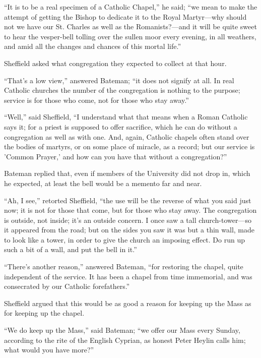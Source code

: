 ``It is to be a real specimen of a Catholic Chapel,'' he
said; ``we mean to make the attempt of getting the Bishop to
dedicate it to the Royal Martyr—why should not we have our St.
Charles as well as the Romanists?—and it will be quite sweet to hear
the vesper-bell tolling over the sullen moor every evening, in all
weathers, and amid all the changes and chances of this mortal
life.''

Sheffield asked what congregation they expected to collect at that
hour.

``That's a low view,'' answered Bateman; ``it does not
signify at all. In real Catholic churches the number of the
congregation is nothing to the purpose; service is for those who come,
not for those who stay away.''

``Well,'' said Sheffield, ``I understand what that
means when a Roman Catholic says it; for a priest is supposed to offer
sacrifice, which he can do without a congregation as well as with one.
And, again, Catholic chapels often stand over the bodies of martyrs,
or on some place of miracle, as a record; but our service is 'Common
Prayer,' and how can you have that without a congregation?''

Bateman replied that, even if members of the University did not
drop in, which he expected, at least the bell would be a memento far
and near.

``Ah, I see,'' retorted Sheffield, ``the use will be
the reverse of what you said just now; it is not for those that come,
but for those who stay away. The congregation is outside, not inside;
it's an outside concern. I once saw a tall church-tower—so it
appeared from the road; but on the sides you saw it was but a thin
wall, made to look like a tower, in order to give the church an
imposing effect. Do run up such a bit of a wall, and put the bell in
it.''

``There's another reason,'' answered Bateman, ``for
restoring the chapel, quite independent of the service. It has
been a chapel from time immemorial, and was consecrated by our
Catholic forefathers.''

Sheffield argued that this would be as good a reason for keeping up
the Mass as for keeping up the chapel.

``We do keep up the Mass,'' said Bateman; ``we offer
our Mass every Sunday, according to the rite of the English Cyprian,
as honest Peter Heylin calls him; what would you have more?''


